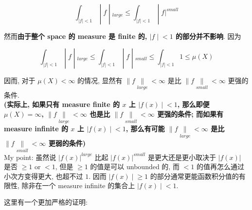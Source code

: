 \documentclass{qlnotes-export}
\begin{document}
\[\left. \int_{|f| < 1} \middle| f \middle| {}_{large} \leq \int_{|f| < 1} \middle| f|^{small} \right.\]

然而\textbf{由于整个 space 的 measure 是 finite 的, \(\left. |f \middle| < 1 \right.\) 的部分并不影响}. 因为

\[\left. \int_{|f| < 1} \middle| f \middle| {}_{large} \leq \int_{|f| < 1} \middle| f \middle| {}_{small} \leq \int_{|f| < 1}1 \leq \mu(X) \right.\]

因而, 对于 \(\mu(X) < \infty\) 的情况, 显然有 \(\parallel f\underset{large}{\parallel} < \infty\) 是比 \(\parallel f\underset{small}{\parallel} < \infty\) 更强的条件.\\
\textbf{(实际上, 如果只有 measure finite 的 \(x\) 上 \(\left. |f(x) \middle| < 1 \right.\), 那么即便 \(\mu(X) = \infty\), \(\parallel f\underset{large}{\parallel} < \infty\) 也是比 \(\parallel f\underset{small}{\parallel} < \infty\) 更强的条件; 而如果有 measure infinite 的 \(x\) 上 \(\left. |f(x) \middle| < 1 \right.\), 那么有可能 \(\parallel f\underset{large}{\parallel} < \infty\) 是比 \(\parallel f\underset{small}{\parallel} < \infty\) 更弱的条件)}\\
My point: 虽然说 \(|f(x)|^{large}\) 比起 \(|f(x)|^{small}\) 是更大还是更小取决于 \(|f(x)|\) 是否 \(\geq 1\) or \(< 1\), 但是 \(\geq 1\) 的值是可以 unbounded 的, 而 \(< 1\) 的值再怎么通过小次方变得更大, 也超不过 \(1\). 因而 \(\left. |f(x) \middle| \geq 1 \right.\) 的部分通常更能函数积分值的有限性, 除非在一个 measure infinite 的集合上 \(\left. |f(x) \middle| < 1 \right.\).

这里有一个更加严格的证明:
\end{document}
